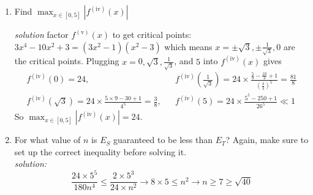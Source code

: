 \documentclass[11pt]{article}
\begin{document}
\begin{enumerate}
\begin{enumerate}
            {\em solution:}
            $$ E_T \le \frac{2\times 125}{24 n^2}\le .01\longrightarrow n^2 \ge \frac{100 \times 125}{12}\longrightarrow n\ge\sqrt{ \frac{25\times 125}{3}}
            \longrightarrow n\ge 33$$
            \newpage
            \item Find  $\max_{x\in [0,5]} |f^{(\mathrm{iv})}(x)|$
            
            {\em solution} factor $f^{(\mathrm{v})}(x)$ to get critical points: $3x^4 -10x^2+3 = (3x^2 -1)(x^2-3)$ which means $x = \pm \sqrt3, \pm \frac1{\sqrt{3}},0$ are the critical points. Plugging $x = $0$ ,\sqrt{3}, \frac{1}{\sqrt{3}}$,  and $5$ into $f^{(\mathrm{iv})}(x)$ gives
            \begin{align*}
            f^{(\mathrm{iv})}(0)=24,& &
            f^{(\mathrm{iv})}(\frac{1}{\sqrt{3}})=24\times \frac{\frac59 - \frac{10}{3} +1}{(\frac43)^5} = 
            \frac{81}{8}\\
            f^{(\mathrm{iv})}(\sqrt{3})=24 \times \frac{5\times 9 - 30+1}{4^5} = \frac{3}{8}, & &
            f^{(\mathrm{iv})}(5)=24\times \frac{5^5 -250+1}{26^5}\ll 1
            \end{align*}
            So $\max_{x\in[0,5]} |f^{(\mathrm{iv})}(x)|=24$.
            \item For what value of $n$ is $E_S$ guaranteed to be less than $E_T$? Again, make sure to set up the correct inequality before solving it.\\
            {\em solution:}
            $$\frac{24\times 5^5}{180 n^4}\le \frac{2 \times 5^3}{24 \times n^2} \longrightarrow { 8 \times 5} \le n^2\longrightarrow n\ge 7\ge\sqrt{40}$$
        \end{enumerate}
    \end{enumerate}
\end{document}
